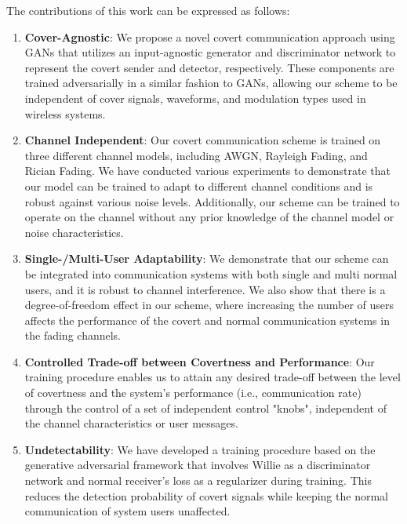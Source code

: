 The contributions of this work can be expressed as follows:
\begin{enumerate}
	\item \textbf{Cover-Agnostic}: We propose a novel covert communication approach using GANs that utilizes an input-agnostic generator and discriminator network to represent the covert sender and detector, respectively. These components are trained adversarially in a similar fashion to GANs, allowing our scheme to be independent of cover signals, waveforms, and modulation types used in wireless systems.
	\item \textbf{Channel Independent}: Our covert communication scheme is trained on three different channel models, including AWGN, Rayleigh Fading, and Rician Fading. We have conducted various experiments to demonstrate that our model can be trained to adapt to different channel conditions and is robust against various noise levels. Additionally, our scheme can be trained to operate on the channel without any prior knowledge of the channel model or noise characteristics.
	\item \textbf{Single-/Multi-User Adaptability}: We demonstrate that our scheme can be integrated into communication systems with both single and multi normal users, and it is robust to channel interference. We also show that there is a degree-of-freedom effect in our scheme, where increasing the number of users affects the performance of the covert and normal communication systems in the fading channels.
	\item \textbf{Controlled Trade-off between Covertness and Performance}: Our training procedure enables us to attain any desired trade-off between the level of covertness and the system's performance (i.e., communication rate) through the control of a set of independent control "knobs", independent of the channel characteristics or user messages.
	\item \textbf{Undetectability}: We have developed a training procedure based on the generative adversarial framework that involves Willie as a discriminator network and normal receiver's loss as a regularizer during training. This reduces the detection probability of covert signals while keeping the normal communication of system users unaffected.
\end{enumerate}
